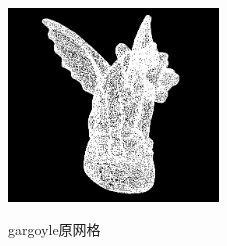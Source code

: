 \documentclass{article}
\begin{document}
	\begin{figure}[htb]
		\caption{\label{table.label} gargoyle原网格} \centering
		\begin{center}
			\includegraphics[width=2.2in]{gargoyle.jpg}
			\label{figure.label}
		\end{center}
	\end{figure}
\end{document}
